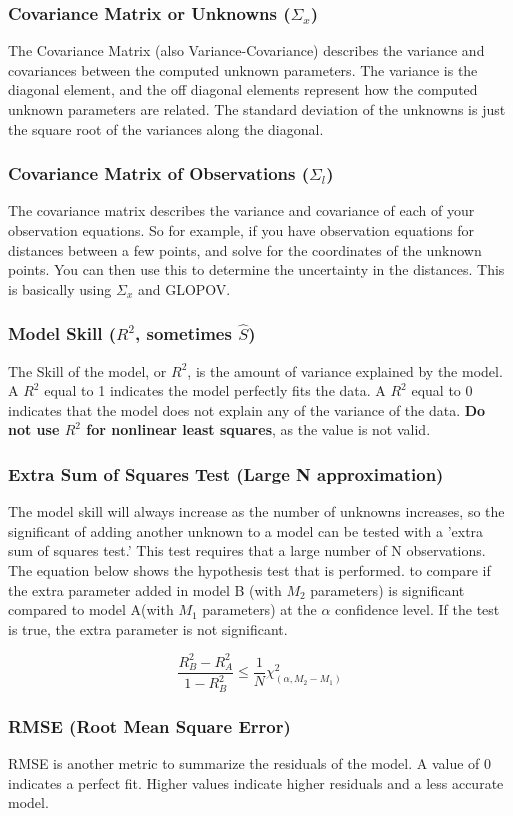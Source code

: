 \subsubsection*{Covariance Matrix or Unknowns ($\Sigma_x$) }
The Covariance Matrix (also Variance-Covariance) describes the variance and covariances between the computed unknown parameters.  The variance is the diagonal element, and the off diagonal elements represent how the computed unknown parameters are related.  The standard deviation of the unknowns is just the square root of the variances along the diagonal.  

\subsubsection*{Covariance Matrix of Observations ($\Sigma_l$)}
The covariance matrix describes the variance and covariance of each of your observation equations.  So for example, if you have observation equations for distances between a few points, and solve for the coordinates of the unknown points.  You can then use this to determine the uncertainty in the distances. This is basically using $\Sigma_x$ and GLOPOV.  


\subsubsection*{Model Skill ($R^2$, sometimes $\hat{S}$)}
The Skill of the model, or $R^2$, is the amount of variance explained by the model.  A $R^2$ equal to 1 indicates the model perfectly fits the data.  A $R^2$ equal to 0 indicates that the model does not explain any of the variance of the data.  \textbf{Do not use $R^2$ for nonlinear least squares}, as the value is not valid.  

\subsubsection*{Extra Sum of Squares Test (Large N approximation)}
The model skill will always increase as the number of unknowns increases, so the significant of adding another unknown to a model can be tested with a 'extra sum of squares test.'  This test requires that a large number of N observations.  The equation below shows the hypothesis test that is performed. to compare if the extra parameter added in model B (with $M_2$ parameters) is significant compared to model A(with $M_1$ parameters) at the $\alpha$ confidence level.  If the test is true, the extra parameter is not significant.

\[
\dfrac{R_B^2 - R_A^2}{1 - R_B^2} \leq \dfrac{1}{N}\chi_{(\alpha,M_2-M_1)}^2
\]

\subsubsection*{RMSE (Root Mean Square Error)}
RMSE is another metric to summarize the residuals of the model.  A value of 0 indicates a perfect fit.  Higher values indicate higher residuals and a less accurate model.